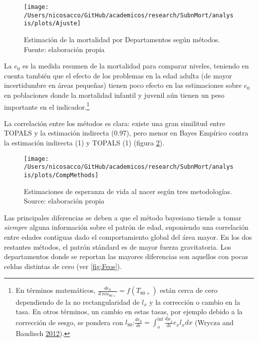 \documentclass[12pt,]{article}
\begin{document}
\begin{figure}

{\centering \texttt{[image: /Users/nicosacco/GitHub/academicos/research/SubnMort/analysis/plots/Ajuste]} 

}

\caption{Estimación de la mortalidad por Departamentos según métodos. Fuente: elaboración propia}\label{fig:Ajuste}
\end{figure}

La \(e_0\) es la medida resumen de la mortalidad para comparar niveles,
teniendo en cuenta también que el efecto de los problemas en la edad
adulta (de mayor incertidumbre en áreas pequeñas) tienen poco efecto en
las estimaciones sobre \(e_0\) en poblaciones donde la mortalidad
infantil y juvenil aún tienen un peso importante en el
indicador.\footnote{En términos matemáticos,
  \(\frac{de_0} {d \ mu_ {80 +}} = f (T_ {80 +})\) están cerca de cero
  dependiendo de la no rectangularidad de \(l_x\) y la corrección o
  cambio en la tasa. En otros términos, un cambio en estas tasas, por
  ejemplo debido a la corrección de sesgo, se pondera con
  \(l_{80}\):\(\frac{de_0} {d \epsilon} = \int_{o}^{\inf}{\frac{d\mu_x} {d \epsilon} e_x l_x dx}\)
  (Wrycza and Baudisch \protect\hyperlink{ref-Wrycza2012}{2012}).}

La correlación entre los métodos es clara: existe una gran similitud
entre TOPALS y la estimación indirecta (0.97), pero menor en Bayes
Empírico contra la estimación indirecta (1) y TOPALS (1) (figura
\ref{fig:comparativeMeth}).

\begin{figure}

{\centering \texttt{[image: /Users/nicosacco/GitHub/academicos/research/SubnMort/analysis/plots/CompMethods]} 

}

\caption{Estimaciones de esperanza de vida al nacer según tres metodologías. Source: elaboración propia}\label{fig:comparativeMeth}
\end{figure}

Las principales diferencias se deben a que el método bayesiano tiende a
tomar \emph{siempre} alguna información sobre el patrón de edad,
suponiendo una correlación entre edades contiguas dado el comportamiento
global del área mayor. En los dos restantes métodos, el patrón stándard
es de mayor fuerza gravitatoria. Los departamentos donde se reportan las
mayores diferencias son aquellos con pocas celdas distintas de cero (ver
\ref{fig:Feos}).
\end{document}
